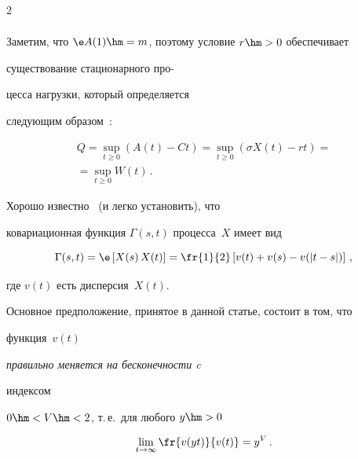 \begin{multicols}{2}
\begin{multline}
\label{e6a-ml}


\end{multline}


Заметим, что $ \e A(1)\hm=m$, поэтому  условие  $r\hm>0$ обеспечивает


существование стационарного про-\linebreak\vspace*{-12pt}





\pagebreak





\noindent


цесса нагрузки,  который определяется


следующим образом~\cite{Mandjes}:


\begin{multline}


Q= \sup\limits_{t \geq 0} \left( A(t)-Ct \right)= \sup\limits_{t \geq 0} \left( \sigma X(t)-rt \right)={}\\


{}= \sup\limits_{t \geq 0} W(t)\,.


\label{e6-ml}


\end{multline}


Хорошо известно~\cite{Mandjes} (и легко установить), что


ковариационная функция $\Gamma(s,t)$ процесса~$X$ имеет вид


\begin{equation*}


\Gamma(s,t)=\e\left [X(s)\,X(t)\right]=\fr{1}{2}\left[


v(t)+v(s)-v(|t-s|) \right]\,,


\end{equation*}


где $v(t)$ есть дисперсия~$X(t)$.





Основное предположение, принятое в данной статье, состоит в том, что


функция~$v(t)$ {\it правильно меняется  на бесконечности c


индексом} $0\hm<V\hm<2$, т.\,е.\ для любого $y\hm>0$


$$


\lim\limits_{t \to \infty} \fr{v(yt) }{v(t)}=y^V\,.


$$



\end{multicols}
